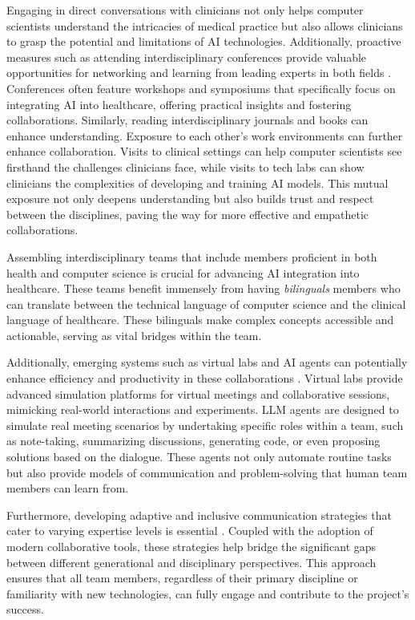 Engaging in direct conversations with clinicians not only helps computer scientists understand the intricacies of medical practice but also allows clinicians to grasp the potential and limitations of AI technologies. 
Additionally, proactive measures such as attending interdisciplinary conferences provide valuable opportunities for networking and learning from leading experts in both fields \citep{patel2024crucial}. Conferences often feature workshops and symposiums that specifically focus on integrating AI into healthcare, offering practical insights and fostering collaborations. Similarly, reading interdisciplinary journals and books can enhance understanding. Exposure to each other's work environments can further enhance collaboration. Visits to clinical settings can help computer scientists see firsthand the challenges clinicians face, while visits to tech labs can show clinicians the complexities of developing and training AI models. This mutual exposure not only deepens understanding but also builds trust and respect between the disciplines, paving the way for more effective and empathetic collaborations.

Assembling interdisciplinary teams that include members proficient in both health and computer science is crucial for advancing AI integration into healthcare. These teams benefit immensely from having \textit{bilinguals} members who can translate between the technical language of computer science and the clinical language of healthcare. These bilinguals make complex concepts accessible and actionable, serving as vital bridges within the team.

Additionally, emerging systems such as virtual labs and AI agents can potentially enhance efficiency and productivity in these collaborations \citep{swanson2024virtual}. Virtual labs provide advanced simulation platforms for virtual meetings and collaborative sessions, mimicking real-world interactions and experiments. LLM agents are designed to simulate real meeting scenarios by undertaking specific roles within a team, such as note-taking, summarizing discussions, generating code, or even proposing solutions based on the dialogue. These agents not only automate routine tasks but also provide models of communication and problem-solving that human team members can learn from.

Furthermore, developing adaptive and inclusive communication strategies that cater to varying expertise levels is essential \citep{sankaran2021practical}. Coupled with the adoption of modern collaborative tools, these strategies help bridge the significant gaps between different generational and disciplinary perspectives. This approach ensures that all team members, regardless of their primary discipline or familiarity with new technologies, can fully engage and contribute to the project’s success.

